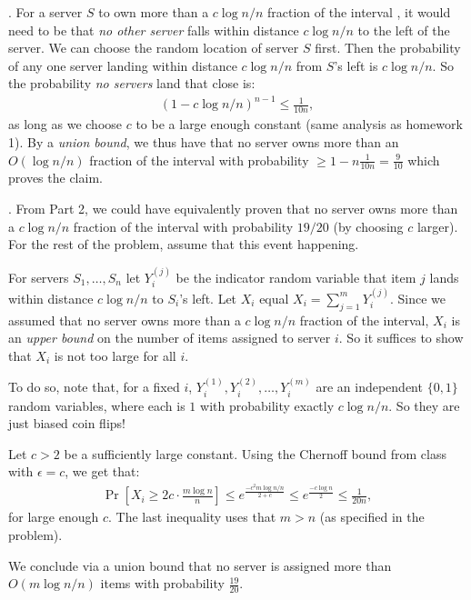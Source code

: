 \documentclass[11pt]{article}
\begin{document}
	\smallskip{}. \hspace{1em} For a server $S$ to own more than a $c\log n/n$ fraction of the interval , it would need to be that \emph{no other server} falls within distance $c\log n/n$ to the left of the server. We can choose the random location of server $S$ first. Then the probability of any one server landing within distance $c\log n /n$ from $S$'s left is $c\log n / n$. So the probability \emph{no servers} land that close is:
	\begin{align*}
		(1 - c\log n / n)^{n-1} \leq \frac{1}{10n},
	\end{align*}
	as long as we choose $c$ to be a large enough constant (same analysis as homework 1). By a \emph{union bound}, we thus have that no server owns more than an $O(\log n / n)$ fraction of the interval with probability $\geq 1 - n\frac{1}{10 n} = \frac{9}{10}$ which proves the claim.
	
	\smallskip{}. \hspace{1em}
	From Part 2, we could have equivalently proven that no server owns more than a $c\log n / n$ fraction of the interval with probability $19/20$ (by choosing $c$ larger). For the rest of the problem, assume that this event happening.
	
	For servers $S_1, \ldots, S_n$ let $Y_i^{(j)}$ be the indicator random variable that item $j$ lands within distance $c\log n / n$ to $S_i$'s left. 
	Let $X_i$ equal $X_i = \sum_{j=1}^m Y_i^{(j)}$.
	Since we assumed that no server owns more than a $c\log n / n$ fraction of the interval, $X_i$ is an \emph{upper bound} on the number of items assigned to server $i$. So it suffices to show that $X_i$ is not too large for all $i$. 
	
	To do so, note that, for a fixed $i$,  $Y_i^{(1)}, Y_i^{(2)}, \ldots, Y_i^{(m)}$ are an independent $\{0,1\}$ random variables, where each is $1$ with probability exactly $c\log n / n$. So they are just biased coin flips!
	
	Let $c > 2$ be a sufficiently large constant. Using the Chernoff bound from class with $\epsilon = c$, we get that:
	\begin{align*}
		\Pr[X_i \geq 2c \cdot \frac{m\log n}{n}] \leq e^{\frac{-c^2m\log n / n}{2+c}} \leq e^{\frac{-c\log n}{2}} \leq \frac{1}{20n}, 
	\end{align*}
	for large enough $c$. The last inequality uses that $m > n$ (as specified in the problem).
	
	We conclude via a union bound that no server is assigned more than $O(m\log n /n)$ items with probability $\frac{19}{20}$. 
	
\end{document}
